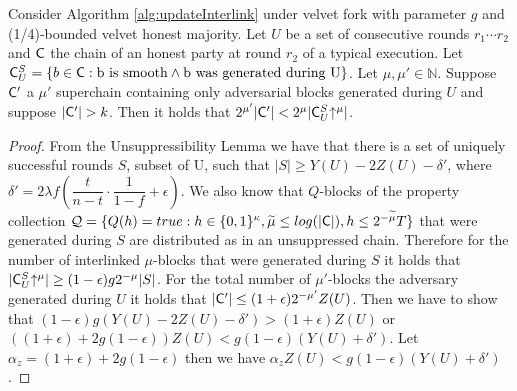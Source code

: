 \begin{lemma}
   Consider Algorithm \ref{alg:updateInterlink} under velvet fork with parameter $g$ and (1/4)-bounded velvet honest majority. Let $U$ be a set of consecutive rounds $r_1 \cdots r_2$ and $\mathsf{C}$ the chain of an honest party at round $r_2$ of a typical execution. Let $\mathsf{C}^S_U = \{b \in \mathsf{C}: \text{b is smooth} \wedge \text{b was generated during U} \}$. Let $\mu, \mu' \in \mathbb{N}$. Suppose $\mathsf{C}'$ a $\mu'$ superchain containing only adversarial blocks generated during $U$ and suppose $\lvert \mathsf{C}' \rvert > k$. Then it holds that $ 2^{\mu'}\lvert \mathsf{C}' \rvert < 2^{\mu}\lvert \mathsf{C}^S_U\negthickspace\uparrow^{\mu} \rvert $.
   \label{lem:claim3_lemma}
\end{lemma}
\begin{proof} From the Unsuppressibility Lemma we have that there is a set of uniquely successful rounds $S$, subset of U, such that $\lvert S \rvert \geq Y(U) - 2Z(U) - \delta'$, where $\delta' = 2 \lambda f (\dfrac{t}{n-t} \cdot \dfrac{1}{1-f} + \epsilon)$. We also know that $Q$-blocks of the property collection $\mathcal{Q} = \{Q(h) = true: h \in \{0,1\}^\kappa, \widetilde{\mu} \leq log(\lvert \mathsf{C} \rvert), h \leq 2^{-\widetilde{\mu}}T \}$ that were generated during $S$ are distributed as in an unsuppressed chain. Therefore for the number of interlinked $\mu$-blocks that were generated during $S$ it holds that  $\lvert \mathsf{C}^S_U\negthickspace\uparrow^{\mu} \rvert \geq (1-\epsilon)g2^{-\mu} \lvert S \rvert$. For the total number of $\mu'$-blocks the adversary generated during $U$ it holds that $\lvert \mathsf{C}' \rvert \leq (1+\epsilon)2^{-\mu'}Z(U)$. Then we have to show that $(1-\epsilon)g (Y(U) - 2Z(U) - \delta' ) > (1+\epsilon)Z(U)$ or $((1+\epsilon)+2g(1-\epsilon))Z(U) < g(1-\epsilon)(Y(U) + \delta')$. Let $\alpha_z = (1+\epsilon)+2g(1-\epsilon)$ then we have $\alpha_z Z(U) < g(1-\epsilon)(Y(U) + \delta')$.


\end{proof}
